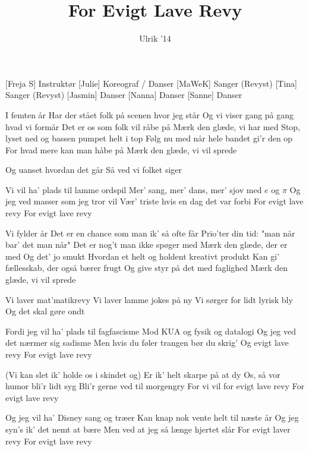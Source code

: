 \documentclass[a4paper,11pt]{article}
\title{For Evigt Lave Revy}
\author{Ulrik '14}
\begin{document}
\maketitle

\begin{roles}
[Freja S] Instruktør
[Julie] Koreograf / Danser
[MaWeK] Sanger (Revyst)
[Tina] Sanger (Revyst)
[Jasmin] Danser
[Nanna] Danser
[Sanne] Danser
\end{roles}

\begin{song}
 I femten år
Har der stået folk på scenen hvor jeg står
Og vi viser gang på gang hvad vi formår
Det er os som folk vil råbe på
Mærk den glæde, vi har med
Stop, lyset ned og bassen pumpet helt i top
Følg nu med når hele bandet gi'r den op
For hvad mere kan man håbe på
Mærk den glæde, vi vil sprede

 Og uanset hvordan det går
Så ved vi folket siger

 Vi vil ha' plads til lamme ordspil
Mer' sang, mer' dans, mer' sjov med $e$ og $\pi$
Og jeg ved masser som jeg tror vil
Vær' triste hvis en dag det var forbi
For evigt lave revy
For evigt lave revy

 Vi fylder år
Det er en chance som man ik' så ofte får
Prio'ter din tid: "man når bar' det man når"
Det er nog't man ikke spøger med
Mærk den glæde, der er med
Og det' jo smukt
Hvordan et helt og holdent kreativt produkt
Kan gi' fællesskab, der også bærer frugt
Og give styr på det med faglighed
Mærk den glæde, vi vil sprede

 Vi laver mat'matikrevy
Vi laver lamme jokes på ny
Vi sørger for lidt lyrisk bly
Og det skal gøre ondt

 Fordi jeg vil ha' plads til fagfascisme
Mod KUA og fysik og datalogi
Og jeg ved det nærmer sig sadisme
Men hvis du føler trangen bør du skrig'
 Og evigt lave revy
For evigt lave revy

 (Vi kan slet ik' holde os i skindet og)
 Er ik' helt skarpe på at dy
Os, så vor humor bli'r lidt syg
Bli'r gerne ved til morgengry
 For vi vil for evigt lave revy
For evigt lave revy

 Og jeg vil ha' Disney sang og træer
Kan knap nok vente helt til næste år
Og jeg syn's ik' det nemt at bære
Men ved at jeg så længe hjertet slår
 For evigt laver revy
For evigt lave revy
\end{song}
\end{document}
